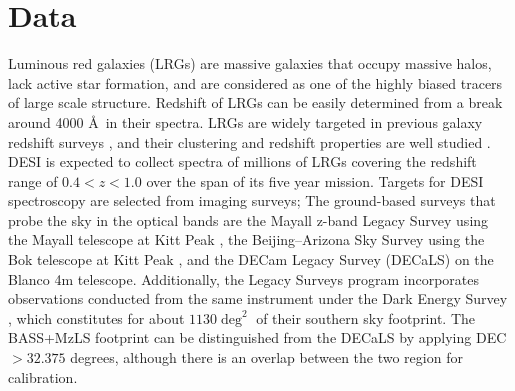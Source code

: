 \section{Data}
\label{sec:data}
Luminous red galaxies (LRGs) are massive galaxies that occupy massive halos, lack active star formation, and are considered as one of the highly biased tracers of large scale structure. Redshift of LRGs can be easily determined from  a break around 4000 \AA~in their spectra. LRGs are widely targeted in previous galaxy redshift surveys , and their clustering and redshift properties are well studied . DESI is expected to collect spectra of millions of LRGs covering the redshift range of $0.4<z<1.0$ over the span of its five year mission. Targets for DESI spectroscopy are selected from imaging surveys; The ground-based surveys that probe the sky in the optical bands are the Mayall z-band Legacy Survey using the Mayall telescope at Kitt Peak , the Beijing–Arizona Sky Survey using the Bok telescope at Kitt Peak , and the DECam Legacy Survey (DECaLS) on the Blanco 4m telescope. Additionally, the Legacy Surveys program incorporates observations conducted from the same instrument under the Dark Energy Survey  , which constitutes for about $1130 \deg^{2}$ of their southern sky footprint. The BASS+MzLS footprint can be distinguished from the DECaLS by applying DEC $> 32.375$ degrees, although there is an overlap between the two region for calibration. 

